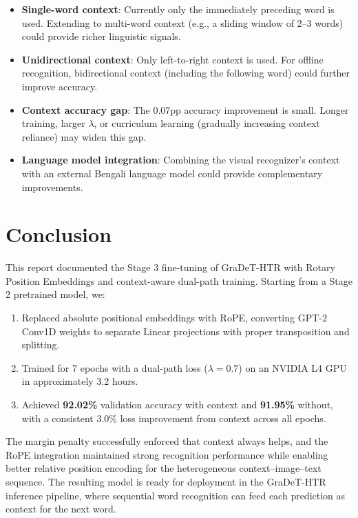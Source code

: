 \documentclass[11pt, a4paper]{article}
\begin{document}
\begin{itemize}
    \item \textbf{Single-word context}: Currently only the immediately preceding word is used. Extending to multi-word context (e.g., a sliding window of 2--3 words) could provide richer linguistic signals.
    \item \textbf{Unidirectional context}: Only left-to-right context is used. For offline recognition, bidirectional context (including the following word) could further improve accuracy.
    \item \textbf{Context accuracy gap}: The 0.07pp accuracy improvement is small. Longer training, larger $\lambda$, or curriculum learning (gradually increasing context reliance) may widen this gap.
    \item \textbf{Language model integration}: Combining the visual recognizer's context with an external Bengali language model could provide complementary improvements.
\end{itemize}

\section{Conclusion}

This report documented the Stage 3 fine-tuning of GraDeT-HTR with Rotary Position Embeddings and context-aware dual-path training. Starting from a Stage 2 pretrained model, we:

\begin{enumerate}
    \item Replaced absolute positional embeddings with RoPE, converting GPT-2 Conv1D weights to separate Linear projections with proper transposition and splitting.
    \item Trained for 7 epochs with a dual-path loss ($\lambda = 0.7$) on an NVIDIA L4 GPU in approximately 3.2 hours.
    \item Achieved \textbf{92.02\%} validation accuracy with context and \textbf{91.95\%} without, with a consistent 3.0\% loss improvement from context across all epochs.
\end{enumerate}

The margin penalty successfully enforced that context always helps, and the RoPE integration maintained strong recognition performance while enabling better relative position encoding for the heterogeneous context--image--text sequence. The resulting model is ready for deployment in the GraDeT-HTR inference pipeline, where sequential word recognition can feed each prediction as context for the next word.
\end{document}
